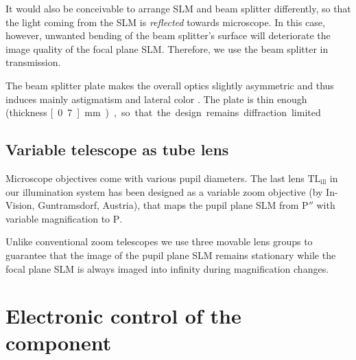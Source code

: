 It would also be conceivable to arrange SLM and beam splitter
differently, so that the light coming from the SLM is \emph{reflected}
towards microscope. In this case, however, unwanted bending of the
beam splitter's surface will deteriorate the image quality of the
focal plane SLM. Therefore, we use the beam splitter in transmission.


The beam splitter plate makes the overall optics slightly asymmetric
and thus induces mainly astigmatism and lateral color
\citep{Ipp2009a}. The plate is thin enough (thickness \unit[0.7]{mm}),
so that the design remains diffraction limited.

 	
	  	

\subsection{ Variable telescope as tube lens}
Microscope objectives come with various pupil diameters. The last lens
$\textrm{TL}_\textrm{ill}$ in our illumination system has been
designed as a variable zoom objective (by In-Vision, Guntramsdorf,
Austria), that maps the pupil plane SLM from $\textrm{P}''$ with
variable magnification to $\textrm{P}$.

Unlike conventional zoom telescopes we use three movable lens groups
to guarantee that the image of the pupil plane SLM remains stationary
while the focal plane SLM is always imaged into infinity during
magnification changes.



\section{Electronic control of the component}


